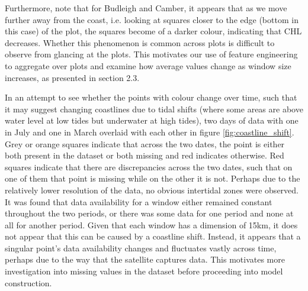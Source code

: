 \documentclass[a4paper,11pt]{report}
\begin{document}
Furthermore, note that for Budleigh and Camber, it appears that as we move further away from the coast, i.e. looking at squares closer to the edge (bottom in this case) of the plot, the squares become of a darker colour, indicating that CHL decreases. Whether this phenomenon is common across plots is difficult to observe from glancing at the plots. This motivates our use of feature engineering to aggregate over plots and examine how average values change as window size increases, as presented in section 2.3. 

In an attempt to see whether the points with colour change over time, such that it may suggest changing coastlines due to tidal shifts (where some areas are above water level at low tides but underwater at high tides), two days of data with one in July and one in March overlaid with each other in figure \ref{fig:coastline_shift}. Grey or orange squares indicate that across the two dates, the point is either both present in the dataset or both missing and red indicates otherwise. Red squares indicate that there are discrepancies across the two dates, such that on one of them that point is missing while on the other it is not. Perhaps due to the relatively lower resolution of the data, no obvious intertidal zones were observed. It was found that data availability for a window either remained constant throughout the two periods, or there was some data for one period and none at all for another period. Given that each window has a dimension of 15km, it does not appear that this can be caused by a coastline shift. Instead, it appears that a singular point's data availability changes and fluctuates vastly across time, perhaps due to the way that the satellite captures data. This motivates more investigation into missing values in the dataset before proceeding into model construction. 
\end{document}
